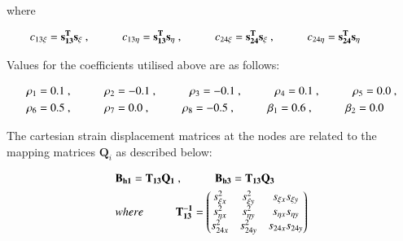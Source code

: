 where

\begin{align*} 
	c_{13 \xi} = \mathbf{s_{13}^T} \mathbf{s_\xi}\ ,
	\hspace{10mm}
	c_{13 \eta} = \mathbf{s_{13}^T} \mathbf{s_\eta}\ ,
	\hspace{10mm}
	c_{24 \xi} = \mathbf{s_{24}^T} \mathbf{s_\xi}\ ,
	\hspace{10mm}
	c_{24 \eta} = \mathbf{s_{24}^T} \mathbf{s_\eta}
	\hspace{10mm}
\end{align*}

Values for the coefficients utilised above are as follows:

\begin{gather} 
	\begin{aligned}
		&\rho_1 = 0.1\ ,
		\hspace{10mm}
		\rho_2 = -0.1\ ,
		\hspace{10mm}
		\rho_3 = -0.1\ ,
		\hspace{10mm}
		\rho_4 = 0.1\ ,
		\hspace{10mm}
		\rho_5 = 0.0\ , \\
		&\rho_6 = 0.5\ ,
		\hspace{10mm}
		\rho_7 = 0.0\ ,
		\hspace{10mm}
		\rho_8 = -0.5\ ,
		\hspace{10mm}
		\beta_1 = 0.6\ ,
		\hspace{10mm}
		\beta_2 = 0.0
		\label{equation16}
	\end{aligned}
\end{gather}

The cartesian strain displacement matrices at the nodes are related to the mapping matrices $\mathbf{Q}_i$ as described below:

\begin{gather} 
	\begin{aligned}
		&\mathbf{B_{h1}} = \mathbf{T_{13}}  \mathbf{Q_{1}}\ ,
		\hspace{10mm}
		\mathbf{B_{h3}} = \mathbf{T_{13}}  \mathbf{Q_{3}}\\
		&where 
		\hspace{10mm} 
		\mathbf{T_{13}^{-1}} =
		\begin{pmatrix}
			s_{\xi x}^2 & s_{\xi y}^2 & s_{\xi x} s_{\xi y} \\
			s_{\eta x}^2 & s_{\eta y}^2 & s_{\eta x} s_{\eta y} \\
			s_{24 x}^2 & s_{24 y}^2 & s_{24 x} s_{24 y}
		\end{pmatrix}
		\label{equation17}
	\end{aligned}
\end{gather}



